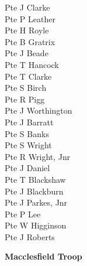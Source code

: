 \begin{multicols}{3}
  Pte J Clarke \\
  Pte P Leather \\
  Pte H Royle \\
  Pte B Gratrix \\
  Pte J Beade \\
  Pte T Hancock \\
  Pte T Clarke \\
  Pte S Birch \\
  Pte R Pigg \\
  Pte J Worthington \\
  Pte J Barratt \\
  Pte S Banks \\
  Pte S Wright \\
  Pte R Wright, Jnr \\
  Pte J Daniel \\
  Pte T Blackshaw \\
  Pte J Blackburn \\
  Pte J Parkes, Jnr \\
  Pte P Lee \\
  Pte W Higginson \\
  Pte J Roberts \\
\end{multicols}

\begin{center}
  \Large
  \textbf{Macclesfield Troop}
\end{center}

